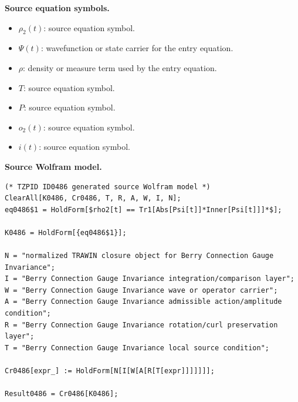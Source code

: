 \begin{minipage}[t]{0.49\linewidth}
\begingroup
\small
\raggedright
\textbf{Source equation symbols.}\par
\begin{itemize}[leftmargin=1.35em,itemsep=1pt,topsep=1pt,parsep=0pt]
    \item $\rho_{2}(t)$: source equation symbol.
    \item $\Psi(t)$: wavefunction or state carrier for the entry equation.
    \item $\rho$: density or measure term used by the entry equation.
    \item $T$: source equation symbol.
    \item $P$: source equation symbol.
    \item $o_{2}(t)$: source equation symbol.
    \item $i(t)$: source equation symbol.
\end{itemize}
\endgroup
\end{minipage}\hfill
\begin{minipage}[t]{0.47\linewidth}
\begingroup
\scriptsize
\raggedright
\textbf{Source Wolfram model.}\par
\begin{Verbatim}[fontsize=\tiny,breaklines=true,breakanywhere=true]
(* TZPID ID0486 generated source Wolfram model *)
ClearAll[K0486, Cr0486, T, R, A, W, I, N];
eq0486$1 = HoldForm[$rho2[t] == Tr1[Abs[Psi[t]]*Inner[Psi[t]]]*$];

K0486 = HoldForm[{eq0486$1}];

N = "normalized TRAWIN closure object for Berry Connection Gauge Invariance";
I = "Berry Connection Gauge Invariance integration/comparison layer";
W = "Berry Connection Gauge Invariance wave or operator carrier";
A = "Berry Connection Gauge Invariance admissible action/amplitude condition";
R = "Berry Connection Gauge Invariance rotation/curl preservation layer";
T = "Berry Connection Gauge Invariance local source condition";

Cr0486[expr_] := HoldForm[N[I[W[A[R[T[expr]]]]]]];

Result0486 = Cr0486[K0486];
\end{Verbatim}
\endgroup
\end{minipage}

